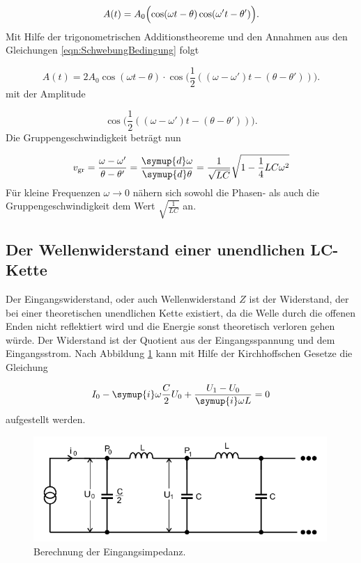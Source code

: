 \begin{equation}
  A(t) = A_0 \Bigl(\cos(\omega t - \theta) \cos(\omega' t - \theta')\Bigr).
\end{equation}
Mit Hilfe der trigonometrischen Additionstheoreme und den Annahmen aus den
Gleichungen \eqref{eqn:SchwebungBedingung} folgt

\begin{equation}
  A(t) = 2 A_0 \cos(\omega t - \theta) \cdot \cos \Bigr(\frac{1}{2}
  ((\omega-\omega')t-(\theta-\theta'))\Bigr).
\end{equation}
mit der Amplitude

\begin{equation}
  \cos \Bigr(\frac{1}{2}
  ((\omega-\omega')t-(\theta-\theta'))\Bigr).
\end{equation}
Die Gruppengeschwindigkeit beträgt nun

\begin{equation}
  v_\text{gr} = \frac{\omega - \omega'}{\theta - \theta'} =
  \frac{\symup{d}\omega}{\symup{d}\theta} =
  \frac{1}{\sqrt{LC}}\sqrt{1 - \frac{1}{4}LC\omega^2}
\end{equation}
Für kleine Frequenzen $\omega \to 0$ nähern sich sowohl die Phasen- als auch
die Gruppengeschwindigkeit dem Wert $\sqrt{\frac{1}{LC}}$ an.


\subsection{Der Wellenwiderstand einer unendlichen LC-Kette}

Der Eingangswiderstand, oder auch Wellenwiderstand $Z$ ist der Widerstand, der
bei einer theoretischen unendlichen Kette existiert, da die Welle durch die
offenen Enden nicht reflektiert wird und die Energie sonst theoretisch
verloren gehen würde.
Der Widerstand ist der Quotient aus der Eingangsspannung und dem Eingangsstrom.
Nach Abbildung \ref{fig:WW} kann mit Hilfe der Kirchhoffschen Gesetze die
Gleichung

\begin{equation}
  I_0 - \symup{i}\omega \frac{C}{2} U_0 + \frac{U_1 - U_0}{\symup{i}\omega L}=0
  \label{eqn:Eingang}
\end{equation}
aufgestellt werden.

\begin{figure}
  \centering
  \includegraphics[height = 4cm]{Wellenwiderstand.png}
  \caption{Berechnung der Eingangsimpedanz.}
  \label{fig:WW}
\end{figure}

